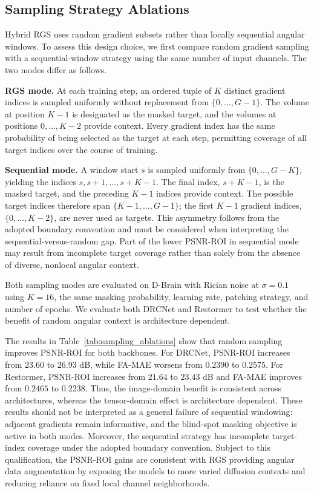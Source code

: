 \documentclass[preprint,12pt]{elsarticle}
\begin{document}
\subsection{Sampling Strategy Ablations}
Hybrid RGS uses random gradient subsets rather than locally sequential angular windows. To assess this design choice, we first compare random gradient sampling with a sequential-window strategy using the same number of input channels. The two modes differ as follows.

\textbf{RGS mode.} At each training step, an ordered tuple of $K$ distinct gradient indices is sampled uniformly without replacement from $\{0,\ldots,G-1\}$. The volume at position $K-1$ is designated as the masked target, and the volumes at positions $0,\ldots,K-2$ provide context. Every gradient index has the same probability of being selected as the target at each step, permitting coverage of all target indices over the course of training.

\textbf{Sequential mode.} A window start $s$ is sampled uniformly from $\{0,\ldots,G-K\}$, yielding the indices $s,s+1,\ldots,s+K-1$. The final index, $s+K-1$, is the masked target, and the preceding $K-1$ indices provide context. The possible target indices therefore span $\{K-1,\ldots,G-1\}$; the first $K-1$ gradient indices, $\{0,\ldots,K-2\}$, are never used as targets. This asymmetry follows from the adopted boundary convention and must be considered when interpreting the sequential-versus-random gap. Part of the lower PSNR-ROI in sequential mode may result from incomplete target coverage rather than solely from the absence of diverse, nonlocal angular context.

Both sampling modes are evaluated on D-Brain with Rician noise at $\sigma=0.1$ using $K=16$, the same masking probability, learning rate, patching strategy, and number of epochs. We evaluate both DRCNet and Restormer to test whether the benefit of random angular context is architecture dependent.

The results in Table~\ref{tab:sampling_ablations} show that random sampling improves PSNR-ROI for both backbones. For DRCNet, PSNR-ROI increases from $23.60$ to $26.93$ dB, while FA-MAE worsens from $0.2390$ to $0.2575$. For Restormer, PSNR-ROI increases from $21.64$ to $23.43$ dB and FA-MAE improves from $0.2465$ to $0.2238$. Thus, the image-domain benefit is consistent across architectures, whereas the tensor-domain effect is architecture dependent. These results should not be interpreted as a general failure of sequential windowing: adjacent gradients remain informative, and the blind-spot masking objective is active in both modes. Moreover, the sequential strategy has incomplete target-index coverage under the adopted boundary convention. Subject to this qualification, the PSNR-ROI gains are consistent with RGS providing angular data augmentation by exposing the models to more varied diffusion contexts and reducing reliance on fixed local channel neighborhoods.
\end{document}
